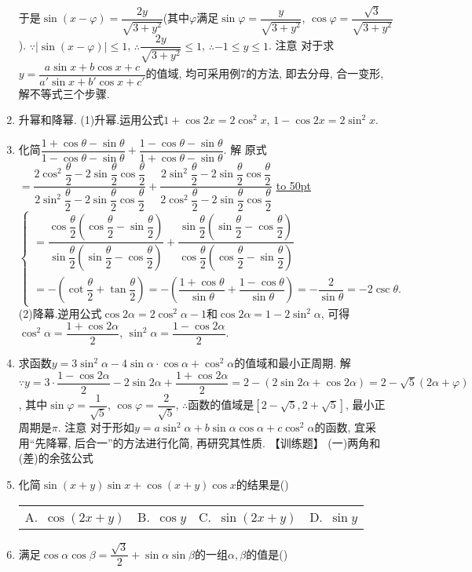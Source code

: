 \documentclass[10pt,a4paper]{article}
\newcommand{\blank}[1]{\underline{\hbox to #1pt{}}}
\newcommand{\fourch}[4]{\par\begin{tabular}{p{.23\textwidth}p{.23\textwidth}p{.23\textwidth}p{.23\textwidth}}
A.~#1 &B.~#2& C.~#3& D.~#4
\end{tabular}}
\begin{document}
\begin{enumerate}[1.]
于是$\sin (x-\varphi)=\dfrac{2y}{\sqrt {3+y^2}}$(其中$\varphi$满足$\sin \varphi =\dfrac y{\sqrt {3+y^2}}$, $\cos \varphi =\dfrac{\sqrt 3}{\sqrt {3+y^2}}$).
$\because|\sin (x-\varphi)|\le 1$, $\therefore \dfrac{2y}{\sqrt {3+y^2}}\le 1$, $\therefore -1\le y\le 1$.
注意  对于求$y=\dfrac{a\sin x+b\cos x+c}{a'\sin x+b'\cos x+c'}$的值域, 均可采用例7的方法, 即去分母, 合一变形, 解不等式三个步骤.
\item 升幂和降幂.
(1)升幂.运用公式$1+\cos 2x=2\cos ^2x$, $1-\cos 2x=2\sin ^2x$.
\item 化简$\dfrac{1+\cos \theta -\sin \theta}{1-\cos \theta -\sin \theta}+\dfrac{1-\cos \theta -\sin \theta}{1+\cos \theta -\sin \theta}$.
解  原式$=\dfrac{2\cos ^2\dfrac{\theta}2-2\sin \dfrac{\theta}2\cos \dfrac{\theta}2}{2\sin ^2\dfrac{\theta}2-2\sin \dfrac{\theta}2\cos \dfrac{\theta}2}+\dfrac{2\sin ^2\dfrac{\theta}2-2\sin \dfrac{\theta}2\cos \dfrac{\theta}2}{2\cos ^2\dfrac{\theta}2-2\sin \dfrac{\theta}2\cos \dfrac{\theta}2}$
\blank{50}$\begin{cases} =\dfrac{\cos \dfrac{\theta}2(\cos \dfrac{\theta}2-\sin \dfrac{\theta}2)}{\sin \dfrac{\theta}2(\sin \dfrac{\theta}2-\cos \dfrac{\theta}2)}+\dfrac{\sin \dfrac{\theta}2(\sin \dfrac{\theta}2-\cos \dfrac{\theta}2)}{\cos \dfrac{\theta}2(\cos \dfrac{\theta}2-\sin \dfrac{\theta}2)} \\ =-(\cot \dfrac\theta 2+\tan \dfrac{\theta}2)=-(\dfrac {1+\cos \theta}{\sin \theta}+\dfrac{1-\cos \theta}{\sin \theta})=-\dfrac 2{\sin \theta}=-2\csc \theta . \end{cases}$
(2)降幕.逆用公式$\cos 2\alpha =2\cos ^2\alpha -1$和$\cos 2\alpha =1-2\sin ^2\alpha$,
可得$\cos ^2\alpha =\dfrac{1+\cos 2\alpha}2$, $\sin ^2\alpha =\dfrac{1-\cos 2\alpha}2$.
\item 求函数$y=3\sin ^2\alpha -4\sin \alpha \cdot \cos \alpha +\cos ^2\alpha$的值域和最小正周期.
解  $\because y=3\cdot \dfrac{1-\cos 2\alpha}2-2\sin 2\alpha +\dfrac{1+\cos 2\alpha}2=2-(2\sin 2\alpha +\cos 2\alpha)=2-\sqrt 5(2\alpha +\varphi)$,
其中$\sin \varphi =\dfrac 1{\sqrt 5}$, $\cos \varphi =\dfrac 2{\sqrt 5}$, $\therefore$函数的值域是$[2-\sqrt 5,2+\sqrt 5]$, 最小正周期是$\pi$.
注意  对于形如$y=a\sin ^2\alpha +b\sin \alpha \cos \alpha +c\cos ^2\alpha$的函数, 宜采用``先降幂, 后合一''的方法进行化简, 再研究其性质.
【训练题】
(一)两角和(差)的余弦公式
\item 化简$\sin (x+y)\sin x+\cos (x+y)\cos x$的结果是()
\fourch{$\cos (2x+y)$}{$\cos y$}{$\sin (2x+y)$}{$\sin y$}
\item 满足$\cos \alpha \cos \beta =\dfrac{\sqrt 3}2+\sin \alpha \sin \beta$的一组$\alpha ,\beta$的值是()

\end{enumerate}
\end{document}
